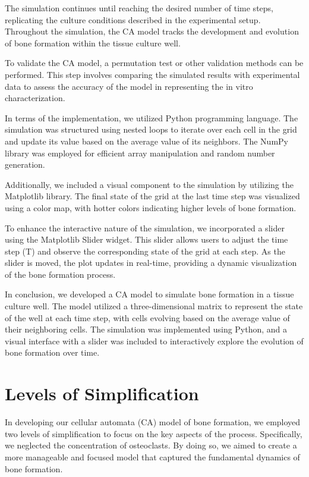 \documentclass[conference]{IEEEtran}
\begin{document}
The simulation continues until reaching the desired number of time steps, replicating the culture conditions described in the experimental setup. Throughout the simulation, the CA model tracks the development and evolution of bone formation within the tissue culture well.

To validate the CA model, a permutation test or other validation methods can be performed. This step involves comparing the simulated results with experimental data to assess the accuracy of the model in representing the in vitro characterization.

In terms of the implementation, we utilized Python programming language. The simulation was structured using nested loops to iterate over each cell in the grid and update its value based on the average value of its neighbors. The NumPy library was employed for efficient array manipulation and random number generation.

Additionally, we included a visual component to the simulation by utilizing the Matplotlib library. The final state of the grid at the last time step was visualized using a color map, with hotter colors indicating higher levels of bone formation.

To enhance the interactive nature of the simulation, we incorporated a slider using the Matplotlib Slider widget. This slider allows users to adjust the time step (T) and observe the corresponding state of the grid at each step. As the slider is moved, the plot updates in real-time, providing a dynamic visualization of the bone formation process.

In conclusion, we developed a CA model to simulate bone formation in a tissue culture well. The model utilized a three-dimensional matrix to represent the state of the well at each time step, with cells evolving based on the average value of their neighboring cells. The simulation was implemented using Python, and a visual interface with a slider was included to interactively explore the evolution of bone formation over time.


\section{Levels of Simplification}
In developing our cellular automata (CA) model of bone formation, we employed two levels of simplification to focus on the key aspects of the process. Specifically, we neglected the concentration of osteoclasts. By doing so, we aimed to create a more manageable and focused model that captured the fundamental dynamics of bone formation.
\end{document}
